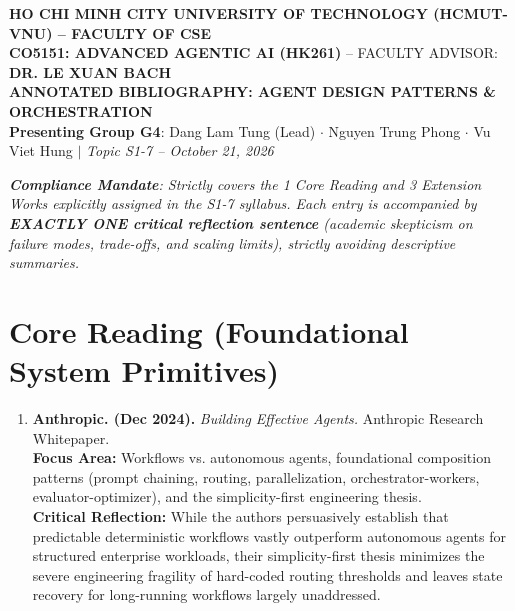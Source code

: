 \documentclass[10pt,a4paper]{article}
\begin{document}
\begin{center}
  {\footnotesize \textbf{HO CHI MINH CITY UNIVERSITY OF TECHNOLOGY (HCMUT-VNU) -- FACULTY OF CSE}}\\[0.04cm]
  {\small \textbf{CO5151: ADVANCED AGENTIC AI (HK261)} -- FACULTY ADVISOR: \textbf{DR. LE XUAN BACH}}\\[0.12cm]
  {\large\bfseries\color{hcmutblue} ANNOTATED BIBLIOGRAPHY: AGENT DESIGN PATTERNS \& ORCHESTRATION}\\[0.04cm]
  {\footnotesize \textbf{Presenting Group G4}: Dang Lam Tung (Lead) $\cdot$ Nguyen Trung Phong $\cdot$ Vu Viet Hung $\vert$ \textit{Topic S1-7 -- October 21, 2026}}
\end{center}

\vspace{-0.15cm}
\noindent\textit{\footnotesize \textbf{Compliance Mandate}: Strictly covers the 1 Core Reading and 3 Extension Works explicitly assigned in the S1-7 syllabus. Each entry is accompanied by \textbf{EXACTLY ONE critical reflection sentence} (academic skepticism on failure modes, trade-offs, and scaling limits), strictly avoiding descriptive summaries.}

\section{Core Reading (Foundational System Primitives)}
\begin{enumerate}[leftmargin=1.4em, itemsep=6pt, topsep=3pt]
  \item \textbf{Anthropic. (Dec 2024).} \textit{Building Effective Agents.} Anthropic Research Whitepaper.\\
  \textbf{Focus Area:} Workflows vs. autonomous agents, foundational composition patterns (prompt chaining, routing, parallelization, orchestrator-workers, evaluator-optimizer), and the simplicity-first engineering thesis.\\
  \textcolor{critiquecolor}{\textbf{Critical Reflection:}} While the authors persuasively establish that predictable deterministic workflows vastly outperform autonomous agents for structured enterprise workloads, their simplicity-first thesis minimizes the severe engineering fragility of hard-coded routing thresholds and leaves state recovery for long-running workflows largely unaddressed.
\end{enumerate}
\end{document}
